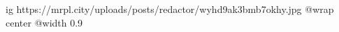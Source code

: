  
 
 
 
 

\ifcmt
  ig https://mrpl.city/uploads/posts/redactor/wyhd9ak3bmb7okhy.jpg
  @wrap center
  @width 0.9
\fi
